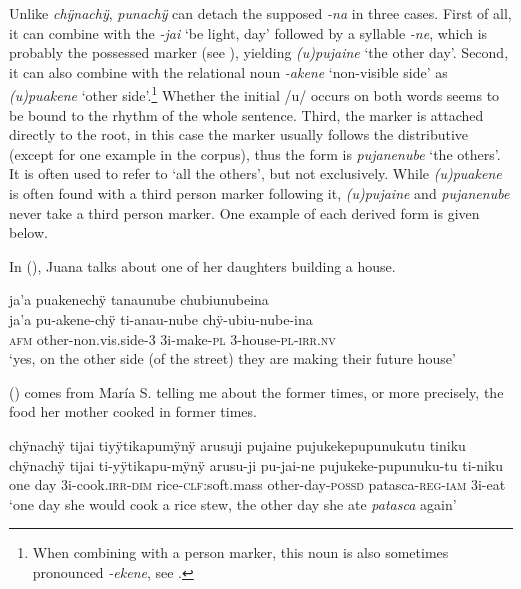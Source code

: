 Unlike \textit{chÿnachÿ}, \textit{punachÿ} can detach the supposed  \textit{-na} in three cases. First of all, it can combine with the  \textit{-jai} ‘be light, day’ followed by a syllable \textit{-ne}, which is probably the possessed marker (see ), yielding \textit{(u)pujaine} ‘the other day’. Second, it can also combine with the relational noun \textit{-akene} ‘non-visible side’ as \textit{(u)puakene} ‘other side’.\footnote{When combining with a person marker, this noun is also sometimes pronounced \textit{-ekene}, see .} Whether the initial /u/ occurs on both words seems to be bound to the rhythm of the whole sentence. Third, the  marker is attached directly to the root, in this case the  marker usually follows the distributive (except for one example in the corpus), thus the form is \textit{pujanenube} ‘the others’. It is often used to refer to ‘all the others’, but not exclusively. While \textit{(u)puakene} is often found with a third person marker following it, \textit{(u)pujaine} and \textit{pujanenube} never take a third person marker. One example of each derived form is given below.

In (), Juana talks about one of her daughters building a house.

\ea\label{ex:other-6}
\begingl
\glpreamble ja’a puakenechÿ tanaunube chubiunubeina\\
\gla ja’a pu-akene-chÿ ti-anau-nube chÿ-ubiu-nube-ina\\
\glb \textsc{afm} other-non.vis.side-3 3i-make-\textsc{pl} 3-house-\textsc{pl}-\textsc{irr.nv}\\
\glft ‘yes, on the other side (of the street) they are making their future house’
\endgl
\trailingcitation{[jxx-p110923l-2.154]}
\xe

() comes from María S. telling me about the former times, or more precisely, the food her mother cooked in former times.

\ea\label{ex:other-7}
\begingl
\glpreamble chÿnachÿ tijai tiyÿtikapumÿnÿ arusuji pujaine pujukekepupunukutu tiniku\\
\gla chÿnachÿ tijai ti-yÿtikapu-mÿnÿ arusu-ji pu-jai-ne pujukeke-pupunuku-tu ti-niku\\
\glb one day 3i-cook.\textsc{irr}-\textsc{dim} rice-\textsc{clf:}soft.mass other-day-\textsc{possd} patasca-\textsc{reg}-\textsc{iam} 3i-eat\\
\glft ‘one day she would cook a rice stew, the other day she ate \textit{patasca} again’
\endgl
\trailingcitation{[rxx-p181101l-2.250]}
\xe

